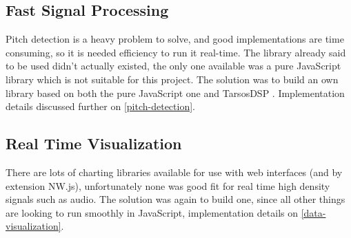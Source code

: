 \subsection{Fast Signal Processing}
Pitch detection is a heavy problem to solve, and good implementations are time
consuming, so it is needed efficiency to run it real-time. The library already said
to be used didn't actually existed, the only one available was a pure JavaScript
library \cite{pitchfinder} which is not suitable for this project. The solution
was to build an own library based on both the pure JavaScript one and TarsosDSP
\cite{TarsosDSP}. Implementation details discussed further on \autoref{pitch-detection}.

\subsection{Real Time Visualization}
There are lots of charting libraries available for use with web interfaces (and
by extension NW.js), unfortunately none was good fit for real time high density
signals such as audio. The solution was again to build one, since all other things
are looking to run smoothly in JavaScript, implementation details on \autoref{data-visualization}.
